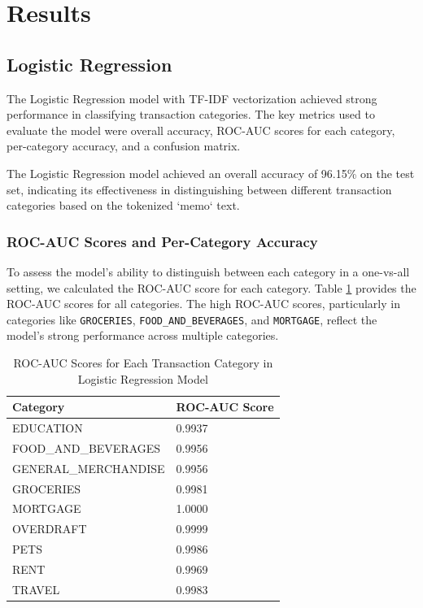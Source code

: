\documentclass[12pt,letterpaper]{article}
\begin{document}
\section{Results}
\subsection{Logistic Regression}

The Logistic Regression model with TF-IDF vectorization achieved strong performance in classifying transaction categories. The key metrics used to evaluate the model were overall accuracy, ROC-AUC scores for each category, per-category accuracy, and a confusion matrix.

The Logistic Regression model achieved an overall accuracy of 96.15\% on the test set, indicating its effectiveness in distinguishing between different transaction categories based on the tokenized `memo` text.

\subsubsection{ROC-AUC Scores and Per-Category Accuracy}
To assess the model’s ability to distinguish between each category in a one-vs-all setting, we calculated the ROC-AUC score for each category. Table \ref{table:roc_auc_scores_logreg} provides the ROC-AUC scores for all categories. The high ROC-AUC scores, particularly in categories like \texttt{GROCERIES}, \texttt{FOOD\_AND\_BEVERAGES}, and \texttt{MORTGAGE}, reflect the model's strong performance across multiple categories.

\begin{table}[h]
    \centering
    \begin{tabular}{ll}
        \hline
        \textbf{Category} & \textbf{ROC-AUC Score} \\
        \hline
        EDUCATION & 0.9937 \\
        FOOD\_AND\_BEVERAGES & 0.9956 \\
        GENERAL\_MERCHANDISE & 0.9956 \\
        GROCERIES & 0.9981 \\
        MORTGAGE & 1.0000 \\
        OVERDRAFT & 0.9999 \\
        PETS & 0.9986 \\
        RENT & 0.9969 \\
        TRAVEL & 0.9983 \\
        \hline
    \end{tabular}
    \caption{ROC-AUC Scores for Each Transaction Category in Logistic Regression Model}
    \label{table:roc_auc_scores_logreg}
\end{table}
\end{document}
